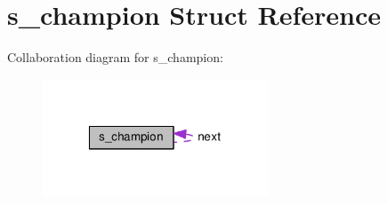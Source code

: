 \hypertarget{structs__champion}{\section{s\-\_\-champion Struct Reference}
\label{structs__champion}
}


Collaboration diagram for s\-\_\-champion\-:
\nopagebreak
\begin{figure}[H]
\begin{center}
\leavevmode
\includegraphics[width=190pt]{structs__champion__coll__graph}
\end{center}
\end{figure}
